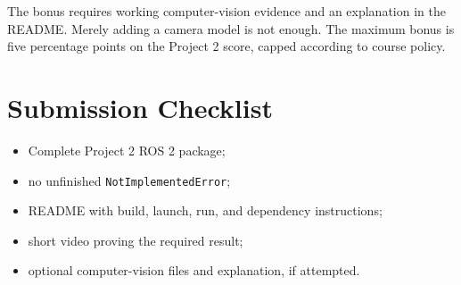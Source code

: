 \documentclass[11pt]{article}
\begin{document}
The bonus requires working computer-vision evidence and an explanation in the
README. Merely adding a camera model is not enough. The maximum bonus is five
percentage points on the Project 2 score, capped according to course policy.

\section*{Submission Checklist}

\begin{itemize}
  \item Complete Project 2 ROS 2 package;
  \item no unfinished \texttt{NotImplementedError};
  \item README with build, launch, run, and dependency instructions;
  \item short video proving the required result;
  \item optional computer-vision files and explanation, if attempted.
\end{itemize}
\end{document}
